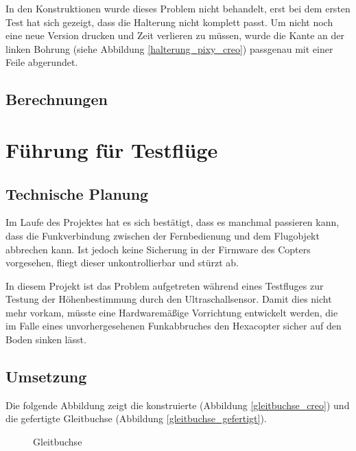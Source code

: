 	In den Konstruktionen wurde dieses Problem nicht behandelt, erst bei dem ersten Test hat sich gezeigt, dass die Halterung nicht komplett passt.
	Um nicht noch eine neue Version drucken und Zeit verlieren zu müssen, wurde die Kante an der linken Bohrung (siehe Abbildung \ref{halterung_pixy_creo}) passgenau mit einer Feile abgerundet.

	\subsection{Berechnungen}

			\newpage

\section{Führung für Testflüge}

	\subsection{Technische Planung}

	Im Laufe des Projektes hat es sich bestätigt, dass es manchmal passieren kann, dass die Funkverbindung zwischen der Fernbedienung und dem Flugobjekt abbrechen kann.
	Ist jedoch keine Sicherung in der Firmware des Copters vorgesehen, fliegt dieser unkontrollierbar und stürzt ab.

	In diesem Projekt ist das Problem aufgetreten während eines Testfluges zur Testung der Höhenbestimmung durch den Ultraschallsensor.
	Damit dies nicht mehr vorkam, müsste eine Hardwaremäßige Vorrichtung entwickelt werden, die im Falle eines unvorhergesehenen Funkabbruches den Hexacopter sicher auf den Boden sinken lässt.

	\subsection{Umsetzung}

	Die folgende Abbildung zeigt die konstruierte (Abbildung \ref{gleitbuchse_creo}) und die gefertigte Gleitbuchse (Abbildung \ref{gleitbuchse_gefertigt}).

			\begin{figure}[tbh]
				\begin{centering}
				\par\end{centering}
				\caption{Gleitbuchse}
				\label{Gleitbuchse}
			\end{figure}

